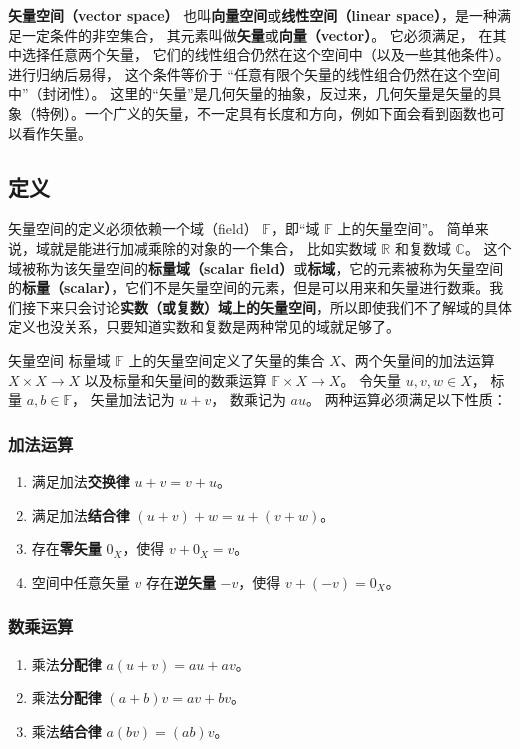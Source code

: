 

\textbf{矢量空间（vector space）} 也叫\textbf{向量空间}或\textbf{线性空间（linear space）}，是一种满足一定条件的非空集合， 其元素叫做\textbf{矢量}或\textbf{向量（vector）}。 它必须满足， 在其中选择任意两个矢量， 它们的线性组合仍然在这个空间中（以及一些其他条件）。 进行归纳后易得， 这个条件等价于 “任意有限个矢量的线性组合仍然在这个空间中”（封闭性）。 这里的“矢量”是几何矢量的抽象，反过来，几何矢量是矢量的具象（特例）。一个广义的矢量，不一定具有长度和方向，例如下面会看到函数也可以看作矢量。

\subsection{定义}
矢量空间的定义必须依赖一个域（field） $\mathbb F$，即“域 $\mathbb{F}$ 上的矢量空间”。 简单来说，域就是能进行加减乘除的对象的一个集合， 比如实数域 $\mathbb R$ 和复数域 $\mathbb C$。 这个域被称为该矢量空间的\textbf{标量域（scalar field）}或\textbf{标域}，它的元素被称为矢量空间的\textbf{标量（scalar）}，它们不是矢量空间的元素，但是可以用来和矢量进行数乘。我们接下来只会讨论\textbf{实数（或复数）域上的矢量空间}，所以即使我们不了解域的具体定义也没关系，只要知道实数和复数是两种常见的域就足够了。

\begin{definition}{矢量空间}
标量域 $\mathbb F$ 上的矢量空间定义了矢量的集合 $X$、两个矢量间的加法运算 $X\times X \to X$ 以及标量和矢量间的数乘运算 $\mathbb F \times X \to X$。 令矢量 $u,v,w \in X$， 标量 $a,b \in \mathbb F$， 矢量加法记为 $u + v$， 数乘记为 $a u$。 两种运算必须满足以下性质：

\subsubsection{加法运算}
\begin{enumerate}
\item 满足加法\textbf{交换律} $u + v = v + u$。
\item 满足加法\textbf{结合律} $(u + v) + w = u + (v + w)$。
\item 存在\textbf{零矢量} $0_X$，使得 $v + 0_X = v$。
\item 空间中任意矢量 $v$ 存在\textbf{逆矢量} $-v$，使得 $v + (-v) = 0_X$。
\end{enumerate}

\subsubsection{数乘运算}
\begin{enumerate}
\item 乘法\textbf{分配律} $a(u + v) = au + av$。
\item 乘法\textbf{分配律} $(a + b)v = av + bv$。
\item 乘法\textbf{结合律} $a (b v) = (ab) v$。
\end{enumerate}
\end{definition}

